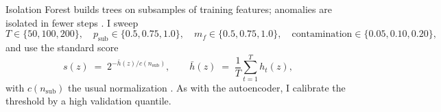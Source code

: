\documentclass[11pt]{article}
\begin{document}
Isolation Forest builds trees on subsamples of training features; anomalies are isolated in fewer steps \parencite{Liu2008,Liu2012}. I sweep
\[
T \in \{50,100,200\},\quad
p_{\text{sub}} \in \{0.5,0.75,1.0\},\quad
m_f \in \{0.5,0.75,1.0\},\quad
\text{contamination} \in \{0.05,0.10,0.20\},
\]
and use the standard score
\[
s(z) \;=\; 2^{-\bar{h}(z)/c(n_{\text{sub}})}, 
\qquad
\bar{h}(z) \;=\; \frac{1}{T}\sum_{t=1}^{T} h_t(z),
\]
with \(c(n_{\text{sub}})\) the usual normalization \parencite{Liu2008}. As with the autoencoder, I calibrate the threshold by a high validation quantile.

\printbibliography %
\end{document}

